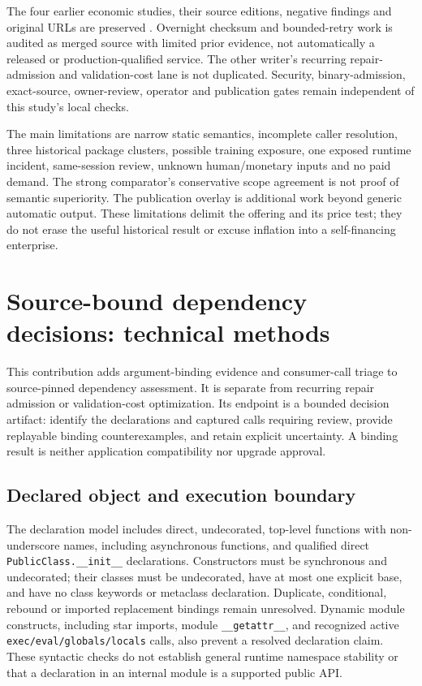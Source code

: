 \documentclass[11pt,letterpaper]{article}
\begin{document}
The four earlier economic studies, their source editions, negative findings and original URLs are preserved \cite{awe,next-advantage,funded-advantage,investment-gate}. Overnight checksum and bounded-retry work is audited as merged source with limited prior evidence, not automatically a released or production-qualified service. The other writer's recurring repair-admission and validation-cost lane is not duplicated. Security, binary-admission, exact-source, owner-review, operator and publication gates remain independent of this study's local checks.

The main limitations are narrow static semantics, incomplete caller resolution, three historical package clusters, possible training exposure, one exposed runtime incident, same-session review, unknown human/monetary inputs and no paid demand. The strong comparator's conservative scope agreement is not proof of semantic superiority. The publication overlay is additional work beyond generic automatic output. These limitations delimit the offering and its price test; they do not erase the useful historical result or excuse inflation into a self-financing enterprise.

\appendix
\section{Source-bound dependency decisions: technical methods}
\label{app:binding-methods}

This contribution adds argument-binding evidence and consumer-call triage to
source-pinned dependency assessment. It is separate from recurring repair
admission or validation-cost optimization. Its endpoint is a bounded decision
artifact: identify the declarations and captured calls requiring review,
provide replayable binding counterexamples, and retain explicit uncertainty.
A binding result is neither application compatibility nor upgrade approval.

\subsection{Declared object and execution boundary}

The declaration model includes direct, undecorated, top-level functions with
non-underscore names, including asynchronous functions, and qualified direct
\texttt{PublicClass.\_\_init\_\_} declarations. Constructors must be synchronous
and undecorated; their classes must be undecorated, have at most one explicit
base, and have no class keywords or metaclass declaration. Duplicate,
conditional, rebound or imported replacement bindings remain unresolved.
Dynamic module constructs, including star imports, module
\texttt{\_\_getattr\_\_}, and recognized active
\texttt{exec/eval/globals/locals} calls, also prevent a resolved declaration
claim. These syntactic checks do not establish general runtime namespace
stability or that a declaration in an internal module is a supported public
API.
\end{document}

